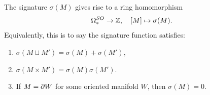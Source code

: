 \begin{lemma}[Thom]
    The signature $\sigma(M)$ gives rise to a ring homomorphism
    \begin{equation*}
        \Omega_*^{SO} \to \mathbb{Z}, \quad [M] \mapsto \sigma(M).
    \end{equation*}
    Equivalently, this is to say the signature function satisfies:
    \begin{enumerate}
        \item $\sigma(M \sqcup M') = \sigma(M) + \sigma(M')$,
        \item $\sigma(M \times M') = \sigma(M) \sigma(M')$.
        \item If $M = \partial W$ for some oriented manifold $W$, then $\sigma(M) = 0$.
    \end{enumerate}
\end{lemma}
